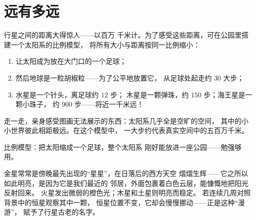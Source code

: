 \section{远有多远}

\begin{method}[太阳系的比例模型]\label{met:g4:solar-system:model}
行星之间的距离大得惊人——以百万
千米计。为了感受这些距离，可在公园里搭建一个太阳系的比例模型，
将所有大小与距离按同一比例缩小：
\begin{enumerate}
  \item 让太阳成为放在大门口的一个足球；
  \item 然后地球是一粒胡椒粒——为了公平地放置它，
        从足球处起走约 $30$ 大步；
  \item 水星是一个针头，离足球约 $12$ 步；
        木星是一颗弹珠，约 $150$ 步；海王星是一颗小珠子，
        约 $900$ 步——将近一千米远！
\end{enumerate}
走一走，亲身感受图画无法展示的东西：太阳系几乎全是空旷的空间，
其中的小小世界彼此相距极远。在这个模型中，
一大步约代表真实空间中的五百万千米。
\end{method}

\begin{omfigure}

{\small 比例模型：把太阳缩成一个足球，整个太阳系
刚好能放进一座公园——勉强够用。}
\end{omfigure}

\begin{example}[天空中的漫游者]\label{ex:g4:solar-system:wanderers}
金星常常是傍晚最先出现的“星星”，在日落后的西方天空
熠熠生辉——它之所以如此明亮，是因为它是我们最近的
邻居，外面包裹着白色云层，能慷慨地把阳光反射回来。
火星发出微弱的橙色光；木星和土星则明亮而稳定。
若连续几周对照背景中的恒星观察其中一颗，
恒星位置不变，它却会慢慢挪动——正是这种“漫游”，
赋予了行星古老的名字。
\end{example}

